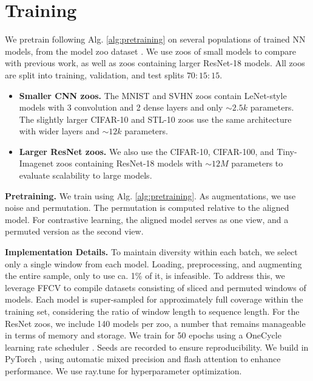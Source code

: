 \section{Training \ourmethod}
We pretrain \ourmethod following Alg. \ref{alg:pretraining} on several populations of trained NN models, from the model zoo dataset \citep{schurholtModelZoosDataset2022}. 
We use zoos of small models to compare with previous work, as well as zoos containing larger ResNet-18 models. 
All zoos are split into training, validation, and test splits $70:15:15$.
\vspace{-10pt}
\begin{itemize}
\item \textbf{Smaller CNN zoos.}
The MNIST and SVHN zoos contain LeNet-style models with 3 convolution and 2 dense layers and only $\sim 2.5k$ parameters. 
The slightly larger CIFAR-10 and STL-10 zoos use the same architecture with wider layers and $\sim 12k$ parameters.
\vspace{-6pt}
\item \textbf{Larger ResNet zoos.}
We also use the CIFAR-10, CIFAR-100, and Tiny-Imagenet zoos containing ResNet-18 models \citep{schurholtModelZoosDataset2022} with $\sim 12M$ parameters to evaluate scalability to large models. 
\end{itemize}

\vspace{-5pt}
\textbf{Pretraining.}
We train \ourmethod using Alg. \ref{alg:pretraining}.
As augmentations, we use noise and permutation. 
The permutation is computed relative to the aligned model. For contrastive learning, the aligned model serves as one view, and a permuted version as the second view. 

\textbf{Implementation Details.} 
To maintain diversity within each batch, we select only a single window from each model. Loading, preprocessing, and augmenting the entire sample, only to use ca. 1\% of it, is infeasible. To address this, we leverage FFCV \citep{leclercFFCVAcceleratingTraining2023} to compile datasets consisting of sliced and permuted windows of models. Each model is super-sampled for approximately full coverage within the training set, considering the ratio of window length to sequence length.
For the ResNet zoos, we include 140 models per zoo, a number that remains manageable in terms of memory and storage. 
We train for 50 epochs using a OneCycle learning rate scheduler \citep{smithSuperConvergenceVeryFast2018}. Seeds are recorded to ensure reproducibility.
We build \ourmethod in PyTorch \citep{paszkePyTorchImperativeStyle2019}, using automatic mixed precision and flash attention \citep{daoFlashAttentionFastMemoryEfficient2022} to enhance performance. We use ray.tune \citep{liawTuneResearchPlatform2018} for hyperparameter optimization. 


